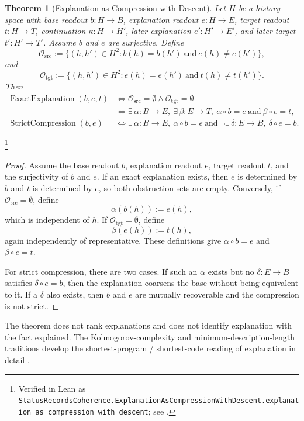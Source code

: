 \documentclass[11pt]{article}
\newtheorem{theorem}{Theorem}[section]
\theoremstyle{definition}
\begin{document}
\begin{theorem}[Explanation as Compression with Descent]\label{thm:F30}
Let \(H\) be a history space with base readout \(b:H\to B\),
explanation readout \(e:H\to E\), target readout \(t:H\to T\),
continuation \(\kappa:H\to H'\), later explanation
\(e':H'\to E'\), and later target \(t':H'\to T'\).  Assume \(b\)
and \(e\) are surjective.  Define
\[
  \mathcal O_{\mathrm{src}}
  :=
  \{(h,h')\in H^2:b(h)=b(h')\ \text{and}\ e(h)\ne e(h')\},
\]
and
\[
  \mathcal O_{\mathrm{tgt}}
  :=
  \{(h,h')\in H^2:e(h)=e(h')\ \text{and}\ t(h)\ne t(h')\}.
\]
Then
\begin{align*}
  \operatorname{ExactExplanation}(b,e,t)
  &\iff
  \mathcal O_{\mathrm{src}}=\emptyset
  \wedge
  \mathcal O_{\mathrm{tgt}}=\emptyset\\
  &\iff
  \exists\,\alpha:B\to E,\ \exists\,\beta:E\to T,\
    \alpha\circ b=e\ \text{and}\ \beta\circ e=t,\\
  \operatorname{StrictCompression}(b,e)
  &\iff
  \exists\,\alpha:B\to E,\ \alpha\circ b=e
  \ \text{and}\ 
  \neg\exists\,\delta:E\to B,\ \delta\circ e=b.
\end{align*}
\end{theorem}
\footnote{\raggedright Verified in Lean as
\texttt{StatusRecordsCoherence.\allowbreak{}ExplanationAsCompression\allowbreak{}WithDescent.\allowbreak{}explanation\_as\_compression\_\allowbreak{}with\_descent};
see \Cref{app:formalization}.}
\begin{proof}
Assume the base readout \(b\), explanation readout \(e\), target
readout \(t\), and the surjectivity of \(b\) and \(e\).  If an exact
explanation exists, then \(e\) is determined by \(b\) and \(t\) is
determined by \(e\), so both obstruction sets are empty.  Conversely,
if \(\mathcal O_{\mathrm{src}}=\emptyset\), define
\[
  \alpha(b(h)):=e(h),
\]
which is independent of \(h\).  If
\(\mathcal O_{\mathrm{tgt}}=\emptyset\), define
\[
  \beta(e(h)):=t(h),
\]
again independently of representative.  These definitions give
\(\alpha\circ b=e\) and \(\beta\circ e=t\).

For strict compression, there are two cases.  If such an
\(\alpha\) exists but no \(\delta:E\to B\) satisfies
\(\delta\circ e=b\), then the explanation coarsens the base without
being equivalent to it.  If a \(\delta\) also exists, then \(b\) and
\(e\) are mutually recoverable and the compression is not strict.
\end{proof}

The theorem does not rank explanations and does not identify
explanation with the fact explained.  The Kolmogorov-complexity and
minimum-description-length traditions develop the
shortest-program / shortest-code reading of explanation in detail
\citep{LiVitanyi2008Kolmogorov}.
\end{document}
